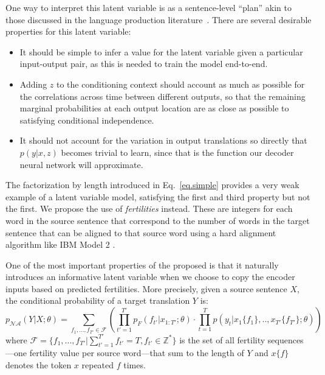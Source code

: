One way to interpret this latent variable is as a sentence-level ``plan'' akin to those discussed in the language production literature~\citep{martin2010planning}. There are several desirable properties for this latent variable:
\begin{itemize}[leftmargin=*]
\item It should be simple to infer a value for the latent variable given a particular input-output pair, as this is needed to train the model end-to-end.
\item Adding $z$ to the conditioning context should account as much as possible for the correlations across time between different outputs, so that the remaining marginal probabilities at each output location are as close as possible to satisfying conditional independence.
\item It should not account for the variation in output translations so directly that $p(y|x, z)$ becomes trivial to learn, since that is the function our decoder neural network will approximate.
\end{itemize}
The factorization by length introduced in Eq.~\ref{eq.simple} provides a very weak example of a latent variable model, satisfying the first and third property but not the first. We propose the use of \emph{fertilities} instead. These are integers for each word in the source sentence that correspond to the number of words in the target sentence that can be aligned to that source word using a hard alignment algorithm like IBM Model 2 \citep{brown1993mathematics}.


One of the most important properties of the proposed \model{} is that it naturally introduces an informative latent variable when we choose to copy the encoder inputs based on predicted fertilities.  More precisely, given a source sentence $X$, the conditional probability of a target translation $Y$ is:
\begin{equation}
p_{\mathcal{NA}}(Y|X; \theta) = \sum_{f_1,...,f_{T'} \in \mathcal{F}}\left(\prod_{t'=1}^{T'}p_F(f_{t'}|x_{1:T'};\theta)\cdot \prod_{t=1}^{T} p(y_t| x_1\{f_1\}, .., x_{T'}\{f_{T'}\};\theta)\right)
\label{eq.latent_fer}
\end{equation}
where $\mathcal{F}=\{f_1,...,f_{T'}| \sum_{t'=1}^{T'}f_{t'}= T, f_{t'} \in \mathbb{Z^*} \}$ is the set of all fertility sequences---one fertility value per source word---that sum to the length of $Y$ and $x\{f\}$ denotes the token $x$ repeated $f$ times.

